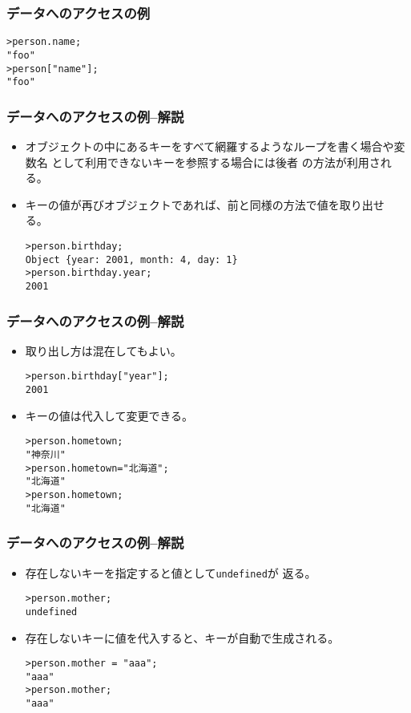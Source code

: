 \begin{frame}[containsverbatim]
\frametitle{データへのアクセスの例}
\begin{Verbatim}
>person.name;
"foo"
>person["name"];
"foo"
\end{Verbatim}
\end{frame}
\begin{frame}[containsverbatim]
\frametitle{データへのアクセスの例--解説}
\begin{itemize}
 \item 
オブジェクトの中にあるキーをすべて網羅するようなループを書く場合や変数名
       として利用できないキーを参照する場合には後者
       の方法が利用される。
 \item キーの値が再びオブジェクトであれば、前と同様の方法で値を取り出せ
       る。
\begin{Verbatim}
>person.birthday;
Object {year: 2001, month: 4, day: 1}
>person.birthday.year;
2001
\end{Verbatim}
\end{itemize}
\end{frame}
\begin{frame}[containsverbatim]
\frametitle{データへのアクセスの例--解説}
\begin{itemize}
 \item 取り出し方は混在してもよい。
\begin{Verbatim}
>person.birthday["year"];
2001
\end{Verbatim}
 \item キーの値は代入して変更できる。
\begin{Verbatim}
>person.hometown;
"神奈川"
>person.hometown="北海道";
"北海道"
>person.hometown;
"北海道"
\end{Verbatim}
\end{itemize}
\end{frame}
\begin{frame}[containsverbatim]
\frametitle{データへのアクセスの例--解説}
\begin{itemize}
 \item 存在しないキーを指定すると値として\Verb+undefined+が
       返る。
\begin{Verbatim}
>person.mother;
undefined
\end{Verbatim}
 \item 存在しないキーに値を代入すると、キーが自動で生成される。
\begin{Verbatim}
>person.mother = "aaa";
"aaa"
>person.mother;
"aaa"
\end{Verbatim}
\end{itemize}
\end{frame}

